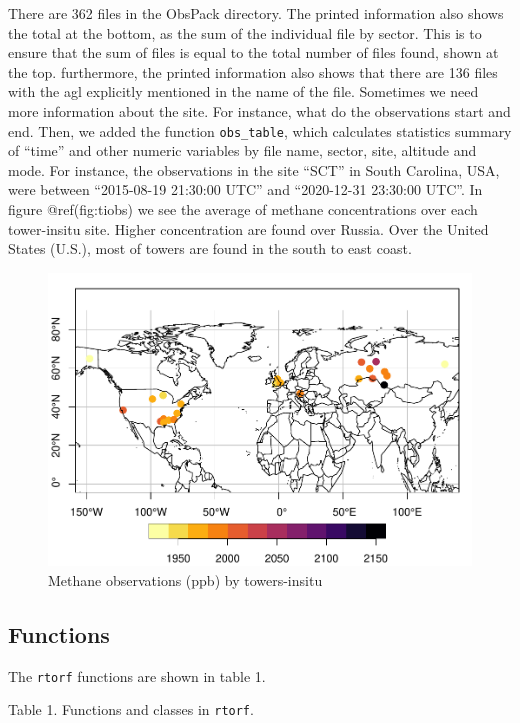 \documentclass[preprint, 3p,
authoryear]{elsarticle} %
\begin{document}
There are 362 files in the ObsPack directory. The printed information
also shows the total at the bottom, as the sum of the individual file by
sector. This is to ensure that the sum of files is equal to the total
number of files found, shown at the top. furthermore, the printed
information also shows that there are 136 files with the agl explicitly
mentioned in the name of the file. Sometimes we need more information
about the site. For instance, what do the observations start and end.
Then, we added the function \texttt{obs\_table}, which calculates
statistics summary of ``time'' and other numeric variables by file name,
sector, site, altitude and mode. For instance, the observations in the
site ``SCT'' in South Carolina, USA, were between ``2015-08-19 21:30:00
UTC'' and ``2020-12-31 23:30:00 UTC''. In figure @ref(fig:tiobs) we see
the average of methane concentrations over each tower-insitu site.
Higher concentration are found over Russia. Over the United States
(U.S.), most of towers are found in the south to east coast.

\begin{figure}
\centering
\includegraphics{paper_elsevier_files/figure-latex/tiobs-1.pdf}
\caption{Methane observations (ppb) by towers-insitu}
\end{figure}

\hypertarget{functions}{%
\subsection{Functions}\label{functions}}

The \texttt{rtorf} functions are shown in table 1.

Table 1. Functions and classes in \texttt{rtorf}.
\end{document}

